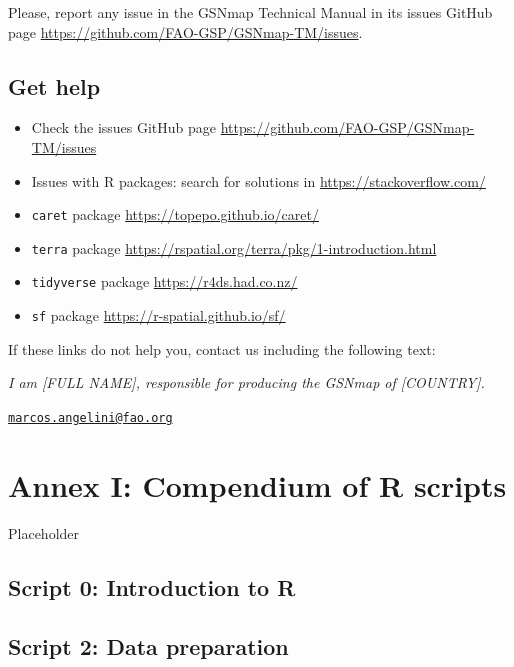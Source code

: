 \documentclass[
  10pt,
  b5paper,
  oneside]{book}
\providecommand{\tightlist}{%
  \setlength{\itemsep}{0pt}\setlength{\parskip}{0pt}}
\begin{document}
Please, report any issue in the GSNmap Technical Manual in its issues GitHub page \url{https://github.com/FAO-GSP/GSNmap-TM/issues}.

\hypertarget{get-help}{%
\section{Get help}\label{get-help}}

\begin{itemize}
\tightlist
\item
  Check the issues GitHub page \url{https://github.com/FAO-GSP/GSNmap-TM/issues}
\item
  Issues with R packages: search for solutions in \url{https://stackoverflow.com/}
\item
  \texttt{caret} package \url{https://topepo.github.io/caret/}
\item
  \texttt{terra} package \url{https://rspatial.org/terra/pkg/1-introduction.html}
\item
  \texttt{tidyverse} package \url{https://r4ds.had.co.nz/}
\item
  \texttt{sf} package \url{https://r-spatial.github.io/sf/}
\end{itemize}

If these links do not help you, contact us including the following text:

\emph{I am {[}FULL NAME{]}, responsible for producing the GSNmap of {[}COUNTRY{]}.}

\href{mailto:marcos.angelini@fao.org}{\nolinkurl{marcos.angelini@fao.org}}

\hypertarget{annex-i-compendium-of-r-scripts}{%
\chapter*{Annex I: Compendium of R scripts}\label{annex-i-compendium-of-r-scripts}}

Placeholder

\hypertarget{script-0-introduction-to-r}{%
\section*{Script 0: Introduction to R}\label{script-0-introduction-to-r}}

\hypertarget{script-2-data-preparation}{%
\section*{Script 2: Data preparation}\label{script-2-data-preparation}}
\end{document}
